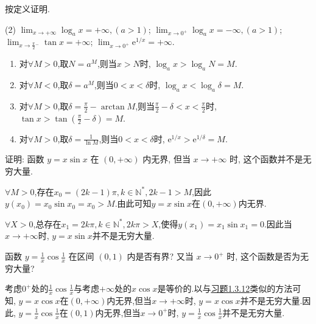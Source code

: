 \begin{exercise}[1.3.11]
    按定义证明.
    \begin{tasks}[label=(\arabic*)](2)
        \task $\lim_{x \to +\infty} \log_a x = +\infty, (a > 1)$;
        \task $\lim_{x \to 0^+} \log_a x = -\infty, (a > 1)$;
        \task $\lim_{x \to \frac{\pi}{2}{}^- }\tan x = +\infty$;
        \task $\lim_{x \to 0^+} \mathrm{e}^{1/x} = +\infty$.
    \end{tasks}
\end{exercise}

\begin{solution}
    \begin{enumerate}[(1)]
        \item 对$\forall M > 0$,取$N = a^M$,则当$x > N$时, $\log_a x > \log_a N = M$.
        \item 对$\forall M < 0$,取$\delta = a^M$,则当$0 < x < \delta$时, $\log_a x < \log_a \delta = M$.
        \item 对$\forall M > 0$,取$\delta = \frac{\pi}{2} - \arctan M$,则当$\frac{\pi}{2} - \delta < x < \frac{\pi}{2}$时, $\tan x > \tan(\frac{\pi}{2} - \delta) = M$.
        \item 对$\forall M > 0$,取$\delta = \frac{1}{\ln M}$,则当$0 < x < \delta$时, $\mathrm{e}^{1/x} > \mathrm{e}^{1/\delta} = M$.
    \end{enumerate}
\end{solution}

\begin{exercise}[1.3.12]\label{exe:1.3.12}
    证明: 函数 $y=x\sin x$ 在 $(0, +\infty)$ 内无界, 但当 $x \to +\infty$ 时, 这个函数并不是无穷大量.
\end{exercise}

\begin{solution}
    $\forall M > 0$,存在$x_0 = (2k-1) \pi, k \in \mathbb{N}^*, 2k - 1 > M$,因此$y(x_0) = x_0 \sin x_0 = x_0 > M$.由此可知$y = x \sin x$在$(0, +\infty)$内无界.

    $\forall X > 0$,总存在$x_1 = 2k \pi, k \in \mathbb{N}^*, 2k \pi > X$,使得$y(x_1) = x_1 \sin x_1 = 0$.因此当$x \to +\infty$时, $y = x \sin x$并不是无穷大量.
\end{solution}

\begin{exercise}[1.3.13]
    函数 $y = \frac{1}{x}\cos\frac{1}{x}$ 在区间 $(0,1)$ 内是否有界? 又当 $x \to 0^+$ 时, 这个函数是否为无穷大量?
\end{exercise}

\begin{solution}
    考虑$0^+$处的$\frac{1}{x} \cos \frac{1}{x}$与考虑$+\infty$处的$x \cos x$是等价的.以与\hyperref[exe:1.3.12]{习题1.3.12}类似的方法可知, $y = x \cos x$在$(0, +\infty)$内无界,但当$x \to +\infty$时, $y = x \cos x$并不是无穷大量.因此, $y = \frac{1}{x} \cos \frac{1}{x}$在$(0, 1)$内无界,但当$x \to 0^+$时, $y = \frac{1}{x} \cos \frac{1}{x}$并不是无穷大量.
\end{solution}


